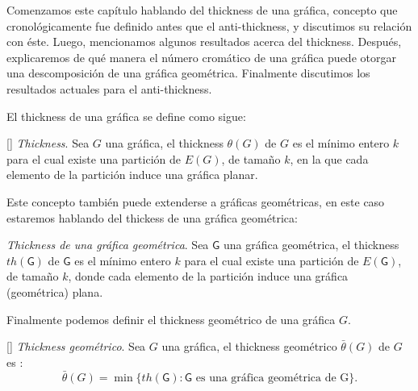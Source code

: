 

Comenzamos este capítulo hablando del thickness de una gráfica, concepto que
cronológicamente fue definido antes que el anti-thickness, y discutimos su
relación con éste. Luego, mencionamos algunos resultados acerca
del thickness. Después, explicaremos de qué manera el número cromático de una
gráfica puede otorgar una descomposición de una gráfica geométrica. Finalmente
discutimos los resultados actuales para el anti-thickness.

El thickness de una gráfica se define como sigue:
\begin{definition}{[\cite{Dillencourt2004}] \emph{Thickness}.}
  Sea $G$ una gráfica, el thickness $\theta(G)$ de $G$ es el mínimo entero $k$
  para el cual existe una partición de $E(G)$, de tamaño $k$, en la que cada
  elemento de la partición induce una gráfica planar.
\end{definition}
Este concepto también puede extenderse a gráficas geométricas, en este caso
estaremos hablando del thickess de una gráfica geométrica:
\begin{definition}{\emph{Thickness de una gráfica geométrica}.}
  Sea $\mathsf{G}$ una gráfica geométrica, el thickness $th(\mathsf{G})$
  de $\mathsf{G}$ es el mínimo entero $k$ para el cual existe una partición de $E(\mathsf{G})$,
  de tamaño $k$, donde cada elemento de la partición induce una
  gráfica (geométrica) plana.
\end{definition}
Finalmente podemos definir el thickness geométrico de una gráfica $G$.
\begin{definition}{[\cite{Dillencourt2004}] \emph{Thickness geométrico}.}
  Sea $G$ una gráfica, el thickness geométrico $\bar{\theta}(G)$ de $G$
  es : \[ \bar{\theta}(G) = \min\{th(\mathsf{G}): \mathsf{G} \text{ es una gráfica geométrica de G} \} .\]
\end{definition}

